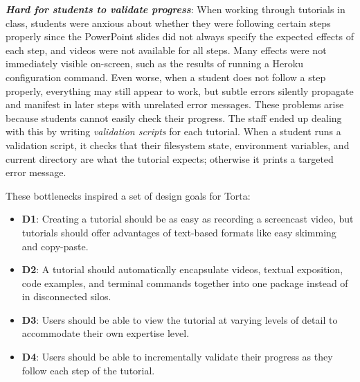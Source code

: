 \textbf{\emph{Hard for students to validate progress}}: When working
through tutorials in class, students were anxious about whether they
were following certain steps properly since the PowerPoint slides did
not always specify the expected effects of each step, and videos were
not available for all steps. Many effects were not immediately
visible on-screen, such as the results of running a Heroku configuration
command. Even worse, when a student does not follow a step properly,
everything may still appear to work, but subtle errors silently
propagate and manifest in later steps with unrelated error messages.
These problems arise because students cannot easily check their
progress. The staff ended up dealing with this by writing
\emph{validation scripts} for each tutorial. When a student runs a
validation script, it checks that their filesystem state, environment
variables, and current directory are what the tutorial expects;
otherwise it prints a targeted error message.

These bottlenecks inspired a set of design goals for Torta:

\begin{itemize}\itemsep0pt

\item \textbf{D1}: Creating a tutorial should be as easy as recording a
screencast video, but tutorials should offer advantages of text-based
formats like easy skimming and copy-paste.

\item \textbf{D2}: A tutorial should automatically encapsulate videos,
textual exposition, code examples, and terminal commands together into
one package instead of in disconnected silos.

\item \textbf{D3}: Users should be able to view the tutorial at
varying levels of detail to accommodate their own expertise level.

\item \textbf{D4}: Users should be able to incrementally validate their progress
as they follow each step of the tutorial.

\end{itemize}